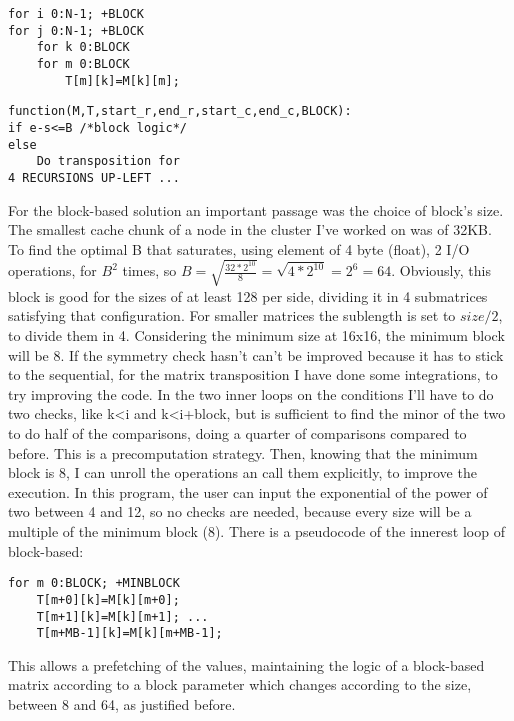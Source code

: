 \begin{minipage}[t]{0.5\columnwidth} 
\begin{lstlisting}[style=Cstyle, caption={Block-Size}]
for i 0:N-1; +BLOCK
for j 0:N-1; +BLOCK
    for k 0:BLOCK
    for m 0:BLOCK
        T[m][k]=M[k][m];
\end{lstlisting}
\end{minipage}\hfill
\begin{minipage}[t]{0.5\columnwidth} 
\begin{lstlisting}[style=Cstyle, caption={Recursive}]
function(M,T,start_r,end_r,start_c,end_c,BLOCK):
if e-s<=B /*block logic*/
else
    Do transposition for 
4 RECURSIONS UP-LEFT ... 
\end{lstlisting}
\end{minipage}
For the block-based solution an important passage was the choice of block's size. The smallest cache chunk of a node in the cluster I've worked on was of 32KB. To find the optimal B that saturates, using element of 4 byte (float), 2 I/O operations, for $B^2$ times, so $B=\sqrt{\frac{32*2^{10}}{8}}=\sqrt{4*2^{10}}=2^6=64$. Obviously, this block is good for the sizes of at least 128 per side, dividing it in 4 submatrices satisfying that configuration. For smaller matrices the sublength is set to $size/2$, to divide them in 4. Considering the minimum size at 16x16, the minimum block will be 8. 
If the symmetry check hasn't can’t be improved because it has to stick to the sequential, for the matrix transposition I have done some integrations, to try improving  the code. In the two inner loops on the conditions I'll have to do two checks, like k<i and k<i+block, but is sufficient to find the minor of the two to do half of the comparisons, doing a quarter of comparisons compared to before. This is a precomputation strategy. Then, knowing that the minimum block is 8, I can unroll the operations an call them explicitly, to improve the execution. In this program, the user can input the exponential of the power of two between 4 and 12, so no checks are needed, because every size will be a multiple of the minimum block (8). There is a pseudocode of the innerest loop of block-based:
\begin{lstlisting}[style=Cstyle, caption={Unroll}]
for m 0:BLOCK; +MINBLOCK
    T[m+0][k]=M[k][m+0];
    T[m+1][k]=M[k][m+1]; ... 
    T[m+MB-1][k]=M[k][m+MB-1];
\end{lstlisting}
This allows a prefetching of the values, maintaining the logic of a block-based matrix according to a block parameter which changes according to the size, between 8 and 64, as justified before.
